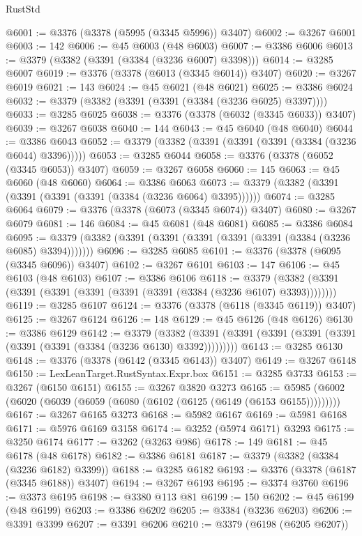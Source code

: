 \begin{lexlean}{RustStd}
\begin{coremodule}
@6001 := @3376 (@3378 (@5995 (@3345 @5996)) @3407)
@6002 := @3267 @6001
@6003 := 142
@6006 := @45 @6003 (@48 @6003)
@6007 := @3386 @6006
@6013 := @3379 (@3382 (@3391 (@3384 (@3236 @6007) @3398)))
@6014 := @3285 @6007
@6019 := @3376 (@3378 (@6013 (@3345 @6014)) @3407)
@6020 := @3267 @6019
@6021 := 143
@6024 := @45 @6021 (@48 @6021)
@6025 := @3386 @6024
@6032 := @3379 (@3382 (@3391 (@3391 (@3384 (@3236 @6025) @3397))))
@6033 := @3285 @6025
@6038 := @3376 (@3378 (@6032 (@3345 @6033)) @3407)
@6039 := @3267 @6038
@6040 := 144
@6043 := @45 @6040 (@48 @6040)
@6044 := @3386 @6043
@6052 := @3379 (@3382 (@3391 (@3391 (@3391 (@3384 (@3236 @6044) @3396)))))
@6053 := @3285 @6044
@6058 := @3376 (@3378 (@6052 (@3345 @6053)) @3407)
@6059 := @3267 @6058
@6060 := 145
@6063 := @45 @6060 (@48 @6060)
@6064 := @3386 @6063
@6073 := @3379 (@3382 (@3391 (@3391 (@3391 (@3391 (@3384 (@3236 @6064) @3395))))))
@6074 := @3285 @6064
@6079 := @3376 (@3378 (@6073 (@3345 @6074)) @3407)
@6080 := @3267 @6079
@6081 := 146
@6084 := @45 @6081 (@48 @6081)
@6085 := @3386 @6084
@6095 := @3379 (@3382 (@3391 (@3391 (@3391 (@3391 (@3391 (@3384 (@3236 @6085) @3394)))))))
@6096 := @3285 @6085
@6101 := @3376 (@3378 (@6095 (@3345 @6096)) @3407)
@6102 := @3267 @6101
@6103 := 147
@6106 := @45 @6103 (@48 @6103)
@6107 := @3386 @6106
@6118 := @3379 (@3382 (@3391 (@3391 (@3391 (@3391 (@3391 (@3391 (@3384 (@3236 @6107) @3393))))))))
@6119 := @3285 @6107
@6124 := @3376 (@3378 (@6118 (@3345 @6119)) @3407)
@6125 := @3267 @6124
@6126 := 148
@6129 := @45 @6126 (@48 @6126)
@6130 := @3386 @6129
@6142 := @3379
    (@3382 (@3391 (@3391 (@3391 (@3391 (@3391 (@3391 (@3391 (@3384 (@3236 @6130) @3392)))))))))
@6143 := @3285 @6130
@6148 := @3376 (@3378 (@6142 (@3345 @6143)) @3407)
@6149 := @3267 @6148
@6150 := LexLeanTarget.RustSyntax.Expr.box
@6151 := @3285 @3733
@6153 := @3267 (@6150 @6151)
@6155 := @3267 @3820 @3273
@6165 := @5985 (@6002 (@6020 (@6039 (@6059 (@6080 (@6102 (@6125 (@6149 (@6153 @6155)))))))))
@6167 := @3267 @6165 @3273
@6168 := @5982 @6167
@6169 := @5981 @6168
@6171 := @5976 @6169 @3158
@6174 := @3252 (@5974 @6171) @3293
@6175 := @3250 @6174
@6177 := @3262 (@3263 @986)
@6178 := 149
@6181 := @45 @6178 (@48 @6178)
@6182 := @3386 @6181
@6187 := @3379 (@3382 (@3384 (@3236 @6182) @3399))
@6188 := @3285 @6182
@6193 := @3376 (@3378 (@6187 (@3345 @6188)) @3407)
@6194 := @3267 @6193
@6195 := @3374 @3760
@6196 := @3373 @6195
@6198 := @3380 @113 @81
@6199 := 150
@6202 := @45 @6199 (@48 @6199)
@6203 := @3386 @6202
@6205 := @3384 (@3236 @6203)
@6206 := @3391 @3399
@6207 := @3391 @6206
@6210 := @3379 (@6198 (@6205 @6207))

\end{coremodule}
\end{lexlean}
